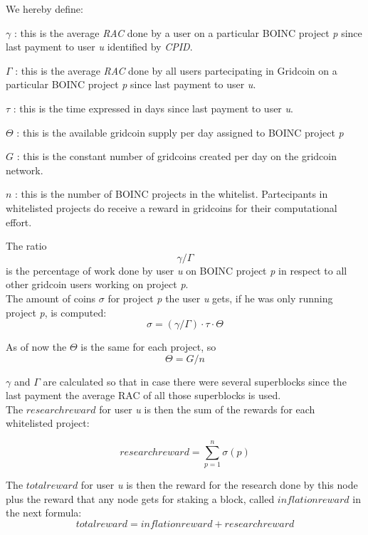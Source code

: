 We hereby define:
\begin{description}
  \item{$\gamma$} : this is the average \textit{RAC} done by a user on a particular BOINC project \textit{p} since last payment to user \textit{u} identified by \textit{CPID}.
  \item{$\Gamma$} : this is the average \textit{RAC} done by all users partecipating in Gridcoin on a particular BOINC project \textit{p} since last payment to user \textit{u}.
  \item{$\tau$} : this is the time expressed in days since last payment to user \textit{u}.
  \item{$\Theta$} : this is the available gridcoin supply per day assigned to BOINC project \textit{p}
  \item{$G$} : this is the constant number of gridcoins created per day on the gridcoin network. 
  \item{$n$} : this is the number of BOINC projects in the whitelist. Partecipants in whitelisted projects do receive a reward in gridcoins for their computational effort.  
\end{description}

The ratio
\[\gamma/\Gamma\]
is the percentage of work done by user \textit{u} on BOINC project \textit{p} in respect to all other gridcoin users working on project \textit{p}.\\

The amount of coins $\sigma$ for project \textit{p} the user \textit{u} gets, if he was only running project \textit{p}, is computed:
\[ \sigma = (\gamma / \Gamma) \cdot \tau \cdot \Theta \]

As of now the $\Theta$ is the same for each project, so
\[ \Theta = G/n \]

$\gamma$ and $\Gamma$ are calculated so that in case there were several superblocks since the last payment the average RAC of all those superblocks is used.\\

The $researchreward$ for user \textit{u} is then the sum of the rewards for each whitelisted project:

\[ researchreward = \sum_{p=1}^{n} \sigma(p) \]


The $totalreward$  for user \textit{u} is then the reward for the research done by this node plus the reward that any node gets for staking a block, called $inflationreward$ in the next formula:
\[ totalreward = inflationreward +  researchreward \]


